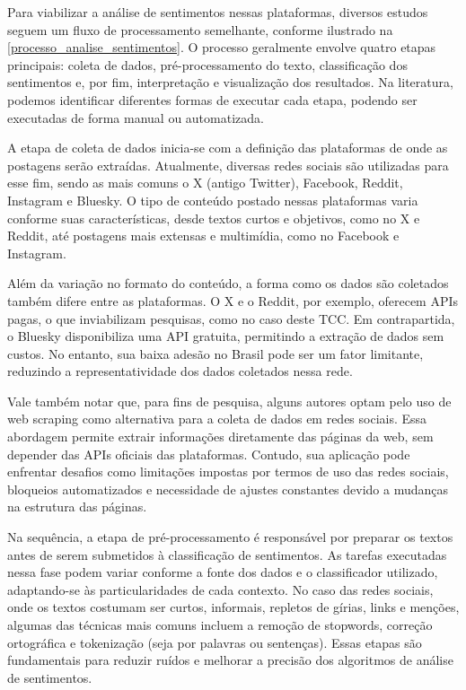 \documentclass[
	12pt,				%
	oneside,			%
	a4paper,			%
	english,			%
	french,				%
	spanish,			%
	brazil				%
	]{abntex2}
\begin{document}
Para viabilizar a análise de sentimentos nessas plataformas, diversos
estudos seguem um fluxo de processamento semelhante, conforme ilustrado
na \autoref{processo_analise_sentimentos}. O processo geralmente envolve
quatro etapas principais: coleta de dados, pré-processamento do texto,
classificação dos sentimentos e, por fim, interpretação e visualização
dos resultados. Na literatura, podemos identificar diferentes formas de
executar cada etapa, podendo ser executadas de forma manual ou
automatizada.

A etapa de coleta de dados inicia-se com a definição das plataformas de
onde as postagens serão extraídas. Atualmente, diversas redes sociais
são utilizadas para esse fim, sendo as mais comuns o X (antigo Twitter),
Facebook, Reddit, Instagram e Bluesky. O tipo de conteúdo postado nessas
plataformas varia conforme suas características, desde textos curtos e
objetivos, como no X e Reddit, até postagens mais extensas e multimídia,
como no Facebook e Instagram.

Além da variação no formato do conteúdo, a forma como os dados são
coletados também difere entre as plataformas. O X e o Reddit, por
exemplo, oferecem APIs pagas, o que inviabilizam pesquisas, como no caso
deste TCC. Em contrapartida, o Bluesky disponibiliza uma API gratuita,
permitindo a extração de dados sem custos. No entanto, sua baixa adesão
no Brasil pode ser um fator limitante, reduzindo a representatividade
dos dados coletados nessa rede.

Vale também notar que, para fins de pesquisa, alguns autores optam pelo
uso de web scraping como alternativa para a coleta de dados em redes
sociais. Essa abordagem permite extrair informações diretamente das
páginas da web, sem depender das APIs oficiais das plataformas. Contudo,
sua aplicação pode enfrentar desafios como limitações impostas por
termos de uso das redes sociais, bloqueios automatizados e necessidade
de ajustes constantes devido a mudanças na estrutura das páginas.

Na sequência, a etapa de pré-processamento é responsável por preparar os
textos antes de serem submetidos à classificação de sentimentos. As
tarefas executadas nessa fase podem variar conforme a fonte dos dados e
o classificador utilizado, adaptando-se às particularidades de cada
contexto. No caso das redes sociais, onde os textos costumam ser curtos,
informais, repletos de gírias, links e menções, algumas das técnicas
mais comuns incluem a remoção de stopwords, correção ortográfica e
tokenização (seja por palavras ou sentenças). Essas etapas são
fundamentais para reduzir ruídos e melhorar a precisão dos algoritmos de
análise de sentimentos.
\end{document}
